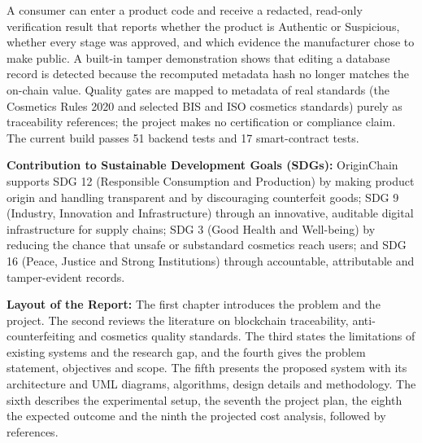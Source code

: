 \documentclass[12pt,a4paper]{report}
\begin{document}
A consumer can enter a product code and receive a redacted, read-only verification result that reports whether the product is Authentic or Suspicious, whether every stage was approved, and which evidence the manufacturer chose to make public. A built-in tamper demonstration shows that editing a database record is detected because the recomputed metadata hash no longer matches the on-chain value. Quality gates are mapped to metadata of real standards (the Cosmetics Rules 2020 and selected BIS and ISO cosmetics standards) purely as traceability references; the project makes no certification or compliance claim. The current build passes 51 backend tests and 17 smart-contract tests.

\vspace{0.4cm}
\noindent \textbf{Contribution to Sustainable Development Goals (SDGs):} OriginChain supports SDG 12 (Responsible Consumption and Production) by making product origin and handling transparent and by discouraging counterfeit goods; SDG 9 (Industry, Innovation and Infrastructure) through an innovative, auditable digital infrastructure for supply chains; SDG 3 (Good Health and Well-being) by reducing the chance that unsafe or substandard cosmetics reach users; and SDG 16 (Peace, Justice and Strong Institutions) through accountable, attributable and tamper-evident records.

\vspace{0.4cm}
\noindent \textbf{Layout of the Report:} The first chapter introduces the problem and the project. The second reviews the literature on blockchain traceability, anti-counterfeiting and cosmetics quality standards. The third states the limitations of existing systems and the research gap, and the fourth gives the problem statement, objectives and scope. The fifth presents the proposed system with its architecture and UML diagrams, algorithms, design details and methodology. The sixth describes the experimental setup, the seventh the project plan, the eighth the expected outcome and the ninth the projected cost analysis, followed by references.

\newpage
\tableofcontents

\newpage
\listoffigures

\newpage
\listoftables
\end{document}
